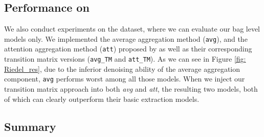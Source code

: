\subsection{Performance on \EntityRE}
We also conduct experiments on the \EntityRE dataset, where we can evaluate our bag level models only. 
We  implemented the average aggregation method (\texttt{avg}), and the attention aggregation method (\texttt{att}) proposed by \cite{lin2016neural} as well as their corresponding transition matrix versions (\texttt{avg\_TM} and \texttt{att\_TM}). As we can see in Figure \ref{fig: Riedel_res},  due to the inferior denoising ability of the average aggregation component, \texttt{avg} performs worst among all those models. %
When we inject our transition matrix approach into both \emph{avg} and \emph{att}, the resulting two  models, both of which can  clearly outperform their basic extraction models.
%

\subsection{Summary}
